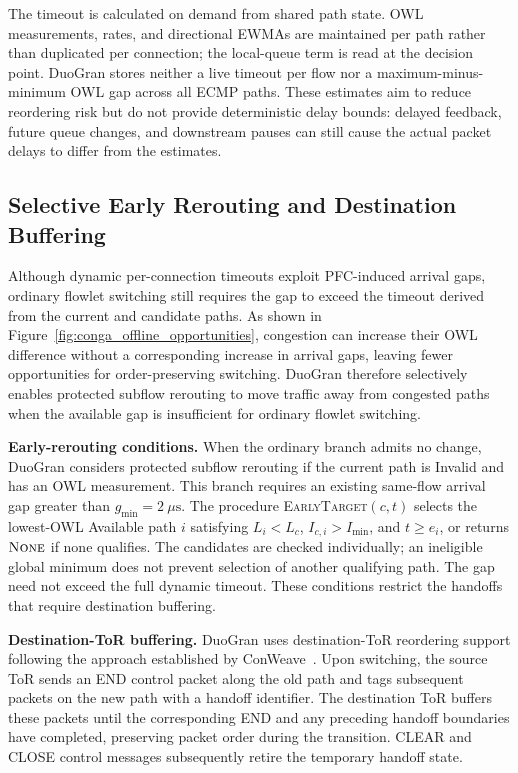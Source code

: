 \documentclass[10pt,journal,compsoc]{IEEEtran}
\begin{document}
The timeout is calculated on demand from shared path state. OWL measurements, rates, and directional EWMAs are maintained per path rather than duplicated per connection; the local-queue term is read at the decision point. DuoGran stores neither a live timeout per flow nor a maximum-minus-minimum OWL gap across all ECMP paths. These estimates aim to reduce reordering risk but do not provide deterministic delay bounds: delayed feedback, future queue changes, and downstream pauses can still cause the actual packet delays to differ from the estimates.

\subsection{Selective Early Rerouting and Destination Buffering}
\label{sec:selective_handoff}

Although dynamic per-connection timeouts exploit PFC-induced arrival gaps, ordinary flowlet switching still requires the gap to exceed the timeout derived from the current and candidate paths. As shown in Figure~\ref{fig:conga_offline_opportunities}, congestion can increase their OWL difference without a corresponding increase in arrival gaps, leaving fewer opportunities for order-preserving switching. DuoGran therefore selectively enables protected subflow rerouting to move traffic away from congested paths when the available gap is insufficient for ordinary flowlet switching.

\noindent
\textbf{Early-rerouting conditions.} When the ordinary branch admits no change, DuoGran considers protected subflow rerouting if the current path is Invalid and has an OWL measurement. This branch requires an existing same-flow arrival gap greater than $g_{\min}=2~\mu\mathrm{s}$. The procedure \textsc{EarlyTarget}$(c,t)$ selects the lowest-OWL Available path $i$ satisfying $L_i<L_c$, $I_{c,i}>I_{\min}$, and $t\geq e_i$, or returns $\textsc{None}$ if none qualifies. The candidates are checked individually; an ineligible global minimum does not prevent selection of another qualifying path. The gap need not exceed the full dynamic timeout. These conditions restrict the handoffs that require destination buffering.

\noindent
\textbf{Destination-ToR buffering.} DuoGran uses destination-ToR reordering support following the approach established by ConWeave~\cite{Conweave}. Upon switching, the source ToR sends an END control packet along the old path and tags subsequent packets on the new path with a handoff identifier. The destination ToR buffers these packets until the corresponding END and any preceding handoff boundaries have completed, preserving packet order during the transition. CLEAR and CLOSE control messages subsequently retire the temporary handoff state.
\end{document}
